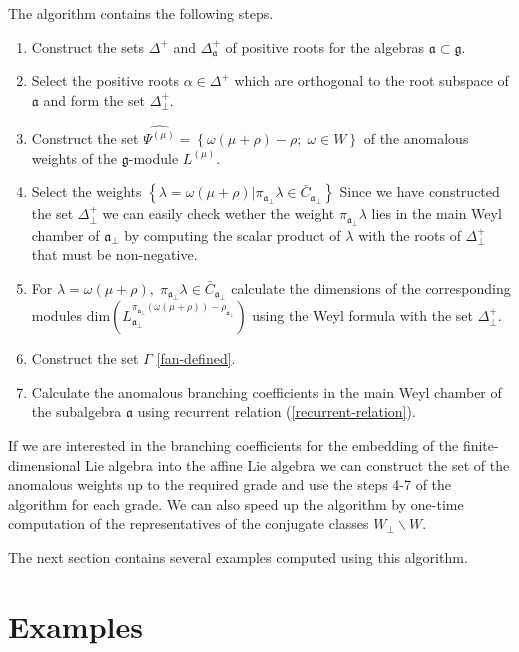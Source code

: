 \documentclass[a4paper,12pt]{article}
\theoremstyle{definition} \newtheorem{Def}{Definition}
\begin{document}
The algorithm contains the following steps.
\begin{enumerate}
\item Construct the sets $\Delta^{+}$ and $\Delta_{\mathfrak{a}}^{+}$ of positive roots for the algebras $\mathfrak{a} \subset \mathfrak{g}$.
\item Select the positive roots $\alpha\in \Delta^{+}$ which are orthogonal to the root subspace of $\mathfrak{a}$ and form the set $\Delta^{+}_{\bot}$.
\item Construct the set $\widehat{\Psi^{(\mu)}}=\left\{\omega(\mu+\rho)-\rho;\; \omega\in W\right\}$ of the anomalous weights of the $\mathfrak{g}$-module $L^{(\mu)}$.
\item Select the weights $\left\{ \lambda=\omega(\mu+\rho) | \pi_{\mathfrak{a}_{\bot}}\lambda \in \bar{C}_{\mathfrak{a}_{\bot}} \right\}$ Since we have constructed the set $\Delta^{+}_{\bot}$ we can easily check wether the weight $\pi_{\mathfrak{a}_{\bot}}\lambda$ lies in the main Weyl chamber of $\mathfrak{a}_{\bot}$ by computing the scalar product of $\lambda$ with the roots of $\Delta^{+}_{\bot}$ that must be non-negative.
\item For $\lambda=\omega(\mu+\rho),\; \pi_{\mathfrak{a}_{\bot}}\lambda\in \bar{C}_{\mathfrak{a}_{\bot}}$ calculate the dimensions of the corresponding modules $\mathrm{dim}\left(L^{\pi_{\mathfrak{a}_{\bot}}(\omega(\mu+\rho))-\rho_{\mathfrak{a}_{\bot}}}_{\mathfrak{a}_{\bot}}\right)$ using the Weyl formula with the set $\Delta^{+}_{\bot}$.
\item Construct the set $\Gamma$ \eqref{fan-defined}.
\item Calculate the anomalous branching coefficients in the main Weyl
  chamber of the subalgebra $\mathfrak{a}$ using recurrent relation (\ref{recurrent-relation}).
\end{enumerate}

If we are interested in the branching coefficients for the embedding of the finite-dimensional Lie algebra into the affine Lie algebra we can construct the set of the anomalous weights up to the required grade and use the steps 4-7 of the algorithm for each grade. We can also speed up the algorithm by one-time computation of the representatives of the conjugate classes $W_{\bot}\backslash W$.

The next section contains several examples computed using this algorithm.

\section{Examples}
\label{sec:examples}
\end{document}
